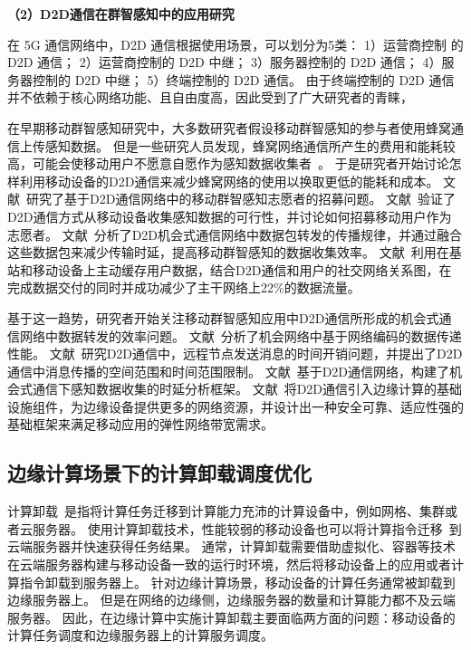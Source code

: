 \textbf{（2）D2D通信在群智感知中的应用研究}

在 5G 通信网络中，D2D 通信根据使用场景，可以划分为5类：
1）运营商控制 的 D2D 通信；%
2）运营商控制的 D2D 中继；%
3）服务器控制的 D2D 通信；%
4）服务器控制的 D2D 中继；%
5）终端控制的 D2D 通信。%
由于终端控制的 D2D 通信并不依赖于核心网络功能、且自由度高，因此受到了广大研究者的青睐，

在早期移动群智感知研究中，大多数研究者假设移动群智感知的参与者使用蜂窝通信上传感知数据。
但是一些研究人员发现，蜂窝网络通信所产生的费用和能耗较高，可能会使移动用户不愿意自愿作为感知数据收集者~\cite{DBLP:conf/globecom/ZhangJLLC16,DBLP:conf/icdcs/XiaoWHHH16}。
于是研究者开始讨论怎样利用移动设备的D2D通信来减少蜂窝网络的使用以换取更低的能耗和成本。
文献~研究了基于D2D通信网络中的移动群智感知志愿者的招募问题。
文献~验证了D2D通信方式从移动设备收集感知数据的可行性，并讨论如何招募移动用户作为志愿者。 
文献~分析了D2D机会式通信网络中数据包转发的传播规律，并通过融合这些数据包来减少传输时延，提高移动群智感知的数据收集效率。
文献~利用在基站和移动设备上主动缓存用户数据，结合D2D通信和用户的社交网络关系图，在完成数据交付的同时并成功减少了主干网络上22\%的数据流量。

基于这一趋势，研究者开始关注移动群智感知应用中D2D通信所形成的机会式通信网络中数据转发的效率问题。
文献~分析了机会网络中基于网络编码的数据传递性能。
文献~研究D2D通信中，远程节点发送消息的时间开销问题，并提出了D2D通信中消息传播的空间范围和时间范围限制。
文献~基于D2D通信网络，构建了机会式通信下感知数据收集的时延分析框架。
文献~将D2D通信引入边缘计算的基础设施组件，为边缘设备提供更多的网络资源，并设计出一种安全可靠、适应性强的基础框架来满足移动应用的弹性网络带宽需求。

\subsection{边缘计算场景下的计算卸载调度优化}

计算卸载~\cite{DBLP:journals/network/MaZZWP13}是指将计算任务迁移到计算能力充沛的计算设备中，例如网格、集群或者云服务器。
使用计算卸载技术，性能较弱的移动设备也可以将计算指令迁移~\cite{DBLP:journals/monet/KumarLLB13}到云端服务器并快速获得任务结果。
通常，计算卸载需要借助虚拟化、容器等技术在云端服务器构建与移动设备一致的运行时环境，然后将移动设备上的应用或者计算指令卸载到服务器上。
针对边缘计算场景，移动设备的计算任务通常被卸载到边缘服务器上。
但是在网络的边缘侧，边缘服务器的数量和计算能力都不及云端服务器。
因此，在边缘计算中实施计算卸载主要面临两方面的问题：移动设备的计算任务调度和边缘服务器上的计算服务调度。

